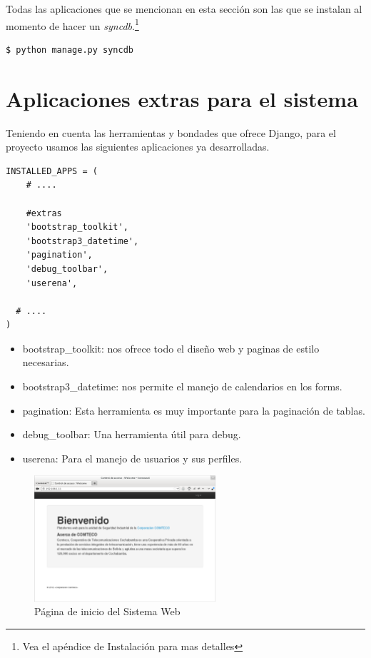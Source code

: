 Todas las aplicaciones que se mencionan en esta sección son las que se instalan
al momento de hacer un {\it syncdb}.\footnote{Vea el apéndice de Instalación para
mas detalles}

\begin{verbatim}
$ python manage.py syncdb
\end{verbatim}

\section{Aplicaciones extras para el sistema}
Teniendo en cuenta las herramientas y bondades que ofrece Django, para el proyecto
usamos las siguientes aplicaciones ya desarrolladas.

\begin{verbatim}
INSTALLED_APPS = (
    # ....

    #extras
    'bootstrap_toolkit',
    'bootstrap3_datetime',
    'pagination',
    'debug_toolbar',
    'userena',

  # ....
)
\end{verbatim}

\begin{itemize}
    \item bootstrap\_toolkit: nos ofrece todo el diseño web y paginas de estilo
      necesarias.
    \item bootstrap3\_datetime: nos permite el manejo de calendarios en los forms.
    \item pagination: Esta herramienta es muy importante para la paginación de tablas.
    \item debug\_toolbar: Una herramienta útil para debug.
    \item userena: Para el manejo de usuarios y sus perfiles.
\end{itemize}

\begin{figure}[h]
  \begin{center}
    \includegraphics[width=0.6\textwidth]{figures/chapter5/homepage.png}
    \caption[Página de inicio del Sistema Web]{Página de inicio del Sistema Web}
  \end{center}
\end{figure}

